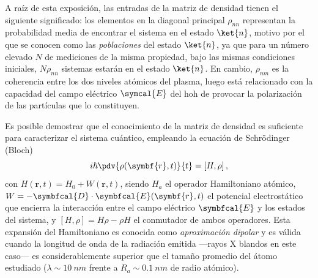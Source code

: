 A raíz de esta exposición, las entradas de la matriz de densidad tienen el siguiente significado: los elementos en la diagonal principal $\rho_{nn}$ representan la probabilidad media de encontrar el sistema en el estado $\ket{n}$, motivo por el que se conocen como las \emph{poblaciones} del estado $\ket{n}$, ya que para un número elevado $N$ de mediciones de la misma propiedad, bajo las mismas condiciones iniciales, $N \rho_{nn}$ sistemas estarán en el estado $\ket{n}$. En cambio, $\rho_{nm}$ es la coherencia entre los dos niveles atómicos del plasma, luego está relacionado con la capacidad del campo eléctrico $\symcal{E}$ del \acrshort{hoh} de provocar la polarización de las partículas que lo constituyen.

Es posible demostrar \autocite{Cohen-Tannoudji2019} que el conocimiento de la matriz de densidad es suficiente para caracterizar el sistema cuántico, empleando la ecuación de Schrödinger (Bloch)
\begin{equation}\label{eq:3.11}
  i \hslash \pdv{\rho(\symbf{r},t)}{t} = \left[H,\rho\right],
\end{equation}
con $H(\symbf{r},t) = H_{0} + W(\symbf{r},t)$, siendo $H_{a}$ el operador Hamiltoniano atómico, $W = -\symbfcal{D} \cdot \symbfcal{E}(\symbf{r},t)$ el potencial electrostático que encierra la interacción entre el campo eléctrico $\symbfcal{E}$ y los estados del sistema, y $\left[H, \rho\right] = H \rho - \rho H$ el conmutador de ambos operadores. Esta expansión del Hamiltoniano es conocida como \emph{aproximación dipolar} \autocite{Jackson1998} y es válida cuando la longitud de onda de la radiación emitida ---rayos X blandos en este caso--- es considerablemente superior que el tamaño promedio del átomo estudiado ($\lambda \sim \qty{10}{nm}$ frente a $R_{a} \sim \qty{0.1}{nm}$ de radio atómico). 

